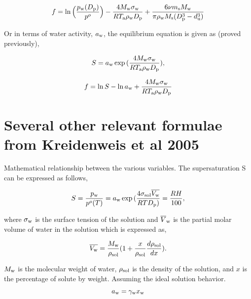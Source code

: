 \documentclass[12pt]{article}
\begin{document}
{\begin{equation}\label{eqn:A12}
f=\ln{\Big(\frac{p_{\rm w}(D_{\rm p})}{p^{o}}\Big)}-\frac{4 M_{\rm w} \sigma_{\rm w}}{R T_{\rm a} \rho_{\rm w} D_{\rm p}}+\frac{6 \nu m_{\rm s} M_{\rm w}}{\pi \rho_{\rm w} M_{\rm s}(D_{\rm p}^{3}-d_{\rm u}^{3})}
\end{equation}

Or in terms of water activity, $a_{\rm w}$, the equilibrium equation is given as (proved previously), 

\begin{equation}\label{eqn:A13}
S=a_{\rm w}\exp{(\frac{4 M_{\rm w} \sigma_{\rm w}}{R T_{\rm a} \rho_{\rm w}D_{\rm p}})}, 
\end{equation}

\begin{equation}\label{eqn:A14}
f=\ln{S}-\ln{a_{\rm w}}+\frac{4 M_{\rm w} \sigma_{\rm w}}{R T_{\rm a} \rho_{\rm w} D_{\rm p}}
\end{equation}


\section{Several other relevant formulae from Kreidenweis et al 2005}

Mathematical relationship between the various variables. The supersaturation S can be expressed as follows,

\begin{equation}
S=\frac{p_{\rm w}}{p^{o}(T)}=a_{\rm w} \exp {(\frac{4 \sigma_{\rm sol} \overline{V_{\rm w}}} {RT D_{\rm p} ) } }= \frac {RH}{100},
\end{equation}

where $\sigma_{\rm w}$ is the surface tension of the solution and $\overline V_{\rm w}$ is the partial molar volume of water in the solution which is expressed as, 

\begin{equation}
\overline{V_{\rm w}}=\frac{ M_{\rm w}}{\rho_{\rm sol}} (1 + \frac{x}{\rho_{\rm sol}} \frac{d \rho_{\rm sol}}{dx}).
\end{equation}

$M_{\rm w}$ is the molecular weight of water, $\rho_{\rm sol}$ is the density of the solution, and $x$ is the percentage of solute by weight. Assuming the ideal solution behavior.

\begin{equation}
a_{\rm w}=\gamma_{\rm w} x_{\rm w}
\end{equation}

}
\end{document}
